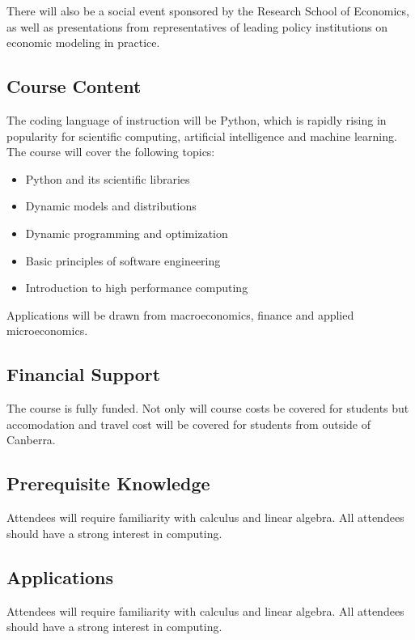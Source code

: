 \documentclass[12pt]{article}
\numberwithin{equation}{section}		%
\numberwithin{table}{section}				%
\begin{document}
There will also be a social event sponsored by the Research School of
Economics, as well as presentations from representatives of leading policy
institutions on economic modeling in practice.


\subsection*{Course Content}

The coding language of instruction will be Python, which is rapidly rising
in popularity for scientific computing, artificial intelligence and machine
learning.  The course will cover the following topics:

\begin{itemize}
    \item Python and its scientific libraries
    \item Dynamic models and distributions
    \item Dynamic programming and optimization
    \item Basic principles of software engineering
    \item Introduction to high performance computing
\end{itemize}

Applications will be drawn from macroeconomics, finance and applied
microeconomics.

\subsection*{Financial Support}

The course is fully funded. Not only will course costs be covered for students but accomodation and travel cost will be covered for students from outside of Canberra.

\subsection*{Prerequisite Knowledge}

Attendees will require familiarity with calculus and linear algebra.
All attendees should have a strong interest in computing.

\subsection*{Applications}

Attendees will require familiarity with calculus and linear algebra.
All attendees should have a strong interest in computing.
\end{document}
